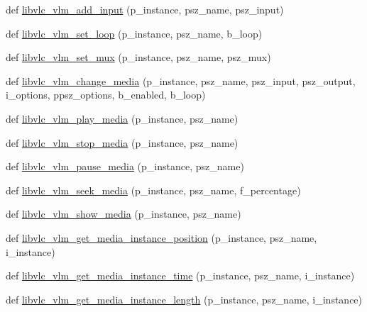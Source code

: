 \begin{DoxyCompactItemize}
\item 
def \hyperlink{namespacesrc_1_1lib_1_1vlc_a3cc88f3f30541addbae27d8bd3e02c22}{libvlc\+\_\+vlm\+\_\+add\+\_\+input} (p\+\_\+instance, psz\+\_\+name, psz\+\_\+input)
\item 
def \hyperlink{namespacesrc_1_1lib_1_1vlc_a150792687f9d5a52159aacfea5ff8d62}{libvlc\+\_\+vlm\+\_\+set\+\_\+loop} (p\+\_\+instance, psz\+\_\+name, b\+\_\+loop)
\item 
def \hyperlink{namespacesrc_1_1lib_1_1vlc_aa6d730a716eb7fbd9e235f17dc23877d}{libvlc\+\_\+vlm\+\_\+set\+\_\+mux} (p\+\_\+instance, psz\+\_\+name, psz\+\_\+mux)
\item 
def \hyperlink{namespacesrc_1_1lib_1_1vlc_ab48d852d47d038ef7ca682e0dccc3835}{libvlc\+\_\+vlm\+\_\+change\+\_\+media} (p\+\_\+instance, psz\+\_\+name, psz\+\_\+input, psz\+\_\+output, i\+\_\+options, ppsz\+\_\+options, b\+\_\+enabled, b\+\_\+loop)
\item 
def \hyperlink{namespacesrc_1_1lib_1_1vlc_a5250bbe0c25834ef1004738b56db6eb5}{libvlc\+\_\+vlm\+\_\+play\+\_\+media} (p\+\_\+instance, psz\+\_\+name)
\item 
def \hyperlink{namespacesrc_1_1lib_1_1vlc_a616b053fb23954cda30e632640aea79c}{libvlc\+\_\+vlm\+\_\+stop\+\_\+media} (p\+\_\+instance, psz\+\_\+name)
\item 
def \hyperlink{namespacesrc_1_1lib_1_1vlc_a730d9d49639bad60647ed57337a405b4}{libvlc\+\_\+vlm\+\_\+pause\+\_\+media} (p\+\_\+instance, psz\+\_\+name)
\item 
def \hyperlink{namespacesrc_1_1lib_1_1vlc_a9649d0e7d884e819237f4faec589a240}{libvlc\+\_\+vlm\+\_\+seek\+\_\+media} (p\+\_\+instance, psz\+\_\+name, f\+\_\+percentage)
\item 
def \hyperlink{namespacesrc_1_1lib_1_1vlc_ad5364895a4daab867d73de72bb98b33e}{libvlc\+\_\+vlm\+\_\+show\+\_\+media} (p\+\_\+instance, psz\+\_\+name)
\item 
def \hyperlink{namespacesrc_1_1lib_1_1vlc_ae2588a05c1bc9a232431d4ccd0a9a589}{libvlc\+\_\+vlm\+\_\+get\+\_\+media\+\_\+instance\+\_\+position} (p\+\_\+instance, psz\+\_\+name, i\+\_\+instance)
\item 
def \hyperlink{namespacesrc_1_1lib_1_1vlc_a6ae1399be5d88a001d019bf523366472}{libvlc\+\_\+vlm\+\_\+get\+\_\+media\+\_\+instance\+\_\+time} (p\+\_\+instance, psz\+\_\+name, i\+\_\+instance)
\item 
def \hyperlink{namespacesrc_1_1lib_1_1vlc_a2aabad47c0d3e0510bf8986752cfda40}{libvlc\+\_\+vlm\+\_\+get\+\_\+media\+\_\+instance\+\_\+length} (p\+\_\+instance, psz\+\_\+name, i\+\_\+instance)

\end{DoxyCompactItemize}
